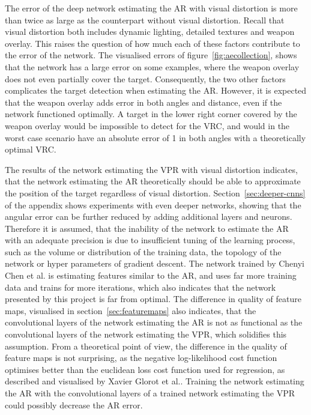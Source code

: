 The error of the deep network estimating the AR with visual distortion is more than twice as large as the counterpart without visual distortion. Recall that visual distortion both includes dynamic lighting, detailed textures and weapon overlay. This raises the question of how much each of these factors contribute to the error of the network. The visualised errors of figure~\ref{fig:aecollection}, shows that the network has a large error on some examples, where the weapon overlay does not even partially cover the target. Consequently, the two other factors complicates the target detection when estimating the AR. However, it is expected that the weapon overlay adds error in both angles and distance, even if the network functioned optimally. A target in the lower right corner covered by the weapon overlay would be impossible to detect for the VRC, and would in the worst case scenario have an absolute error of 1 in both angles with a theoretically optimal VRC.

The results of the network estimating the VPR with visual distortion indicates, that the network estimating the AR theoretically should be able to approximate the position of the target regardless of visual distortion. Section~\ref{sec:deeper-cnns} of the appendix shows experiments with even deeper networks, showing that the angular error can be further reduced by adding additional layers and neurons. Therefore it is assumed, that the inability of the network  to estimate the AR with an adequate precision is due to insufficient tuning of the learning process, such as the volume or distribution of the training data, the topology of the network or hyper parameters of gradient descent. The network trained by Chenyi Chen et al.\cite{chen} is estimating features similar to the AR, and uses far more training data and trains for more iterations, which also indicates that the network presented by this project is far from optimal. The difference in quality of feature maps, visualised in section~\ref{sec:featuremaps} also indicates, that the convolutional layers of the network estimating the AR is not as functional as the convolutional layers of the network estimating the VPR, which solidifies this assumption. From a theoretical point of view, the difference in the quality of feature maps is not surprising, as the negative log-likelihood cost function optimises better than the euclidean loss cost function used for regression, as described and visualised by Xavier Glorot et al.\cite{DBLP:journals/jmlr/GlorotB10}. Training the network estimating the AR with the convolutional layers of a trained network estimating the VPR could possibly decrease the AR error.

